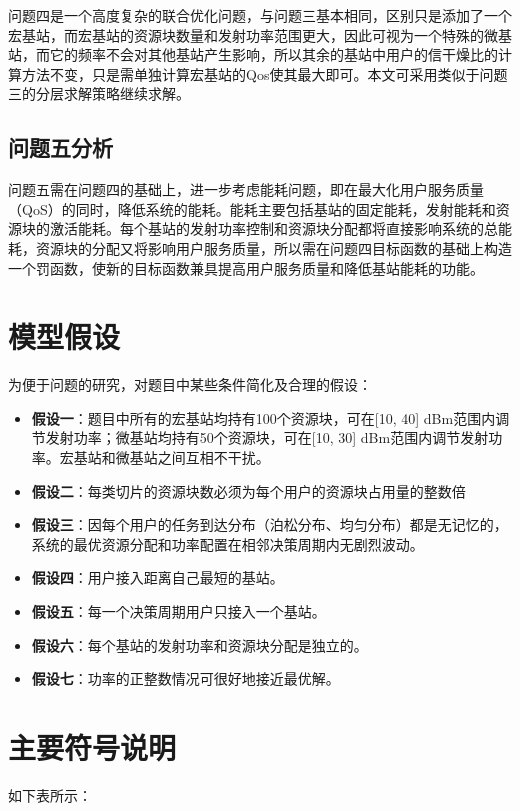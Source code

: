 \documentclass{ctexart}
\begin{document}
问题四是一个高度复杂的联合优化问题，与问题三基本相同，区别只是添加了一个宏基站，而宏基站的资源块数量和发射功率范围更大，因此可视为一个特殊的微基站，而它的频率不会对其他基站产生影响，所以其余的基站中用户的信干燥比的计算方法不变，只是需单独计算宏基站的Qos使其最大即可。本文可采用类似于问题三的分层求解策略继续求解。

\subsection{问题五分析}
问题五需在问题四的基础上，进一步考虑能耗问题，即在最大化用户服务质量（QoS）的同时，降低系统的能耗。能耗主要包括基站的固定能耗，发射能耗和资源块的激活能耗。每个基站的发射功率控制和资源块分配都将直接影响系统的总能耗，资源块的分配又将影响用户服务质量，所以需在问题四目标函数的基础上构造一个罚函数，使新的目标函数兼具提高用户服务质量和降低基站能耗的功能。
\section{模型假设}

为便于问题的研究，对题目中某些条件简化及合理的假设： 
\begin{itemize}
 \item \textbf{假设一}：题目中所有的宏基站均持有100个资源块，可在[10, 40] dBm范围内调节发射功率；微基站均持有50个资源块，可在[10, 30] dBm范围内调节发射功率。宏基站和微基站之间互相不干扰。
 \item \textbf{假设二}：每类切片的资源块数必须为每个用户的资源块占用量的整数倍
 \item \textbf{假设三}：因每个用户的任务到达分布（泊松分布、均匀分布）都是无记忆的，系统的最优资源分配和功率配置在相邻决策周期内无剧烈波动。
 \item \textbf{假设四}：用户接入距离自己最短的基站。
 \item \textbf{假设五}：每一个决策周期用户只接入一个基站。
 \item \textbf{假设六}：每个基站的发射功率和资源块分配是独立的。
 \item \textbf{假设七}：功率的正整数情况可很好地接近最优解。
\end{itemize}


\section{主要符号说明}
如下表所示：
\end{document}

